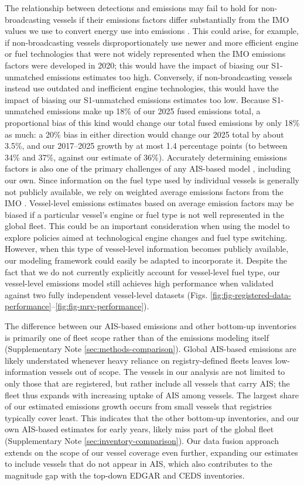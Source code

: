 \documentclass[lineno,pdflatex,sn-nature]{sn-jnl}
\begin{document}
The relationship between detections and emissions may fail to hold for non-broadcasting vessels if their emissions factors differ substantially from the IMO values we use to convert energy use into emissions \cite{fourth2020greenhouse}. This could arise, for example, if non-broadcasting vessels disproportionately use newer and more efficient engine or fuel technologies that were not widely represented when the IMO emissions factors were developed in 2020; this would have the impact of biasing our S1-unmatched emissions estimates too high. Conversely, if non-broadcasting vessels instead use outdated and inefficient engine technologies, this would have the impact of biasing our S1-unmatched emissions estimates too low. Because S1-unmatched emissions make up 18\% of our 2025 fused emissions total, a proportional bias of this kind would change our total fused emissions by only 18\% as much: a 20\% bias in either direction would change our 2025 total by about 3.5\%, and our 2017--2025 growth by at most 1.4 percentage points (to between 34\% and 37\%, against our estimate of 36\%). Accurately determining emissions factors is also one of the primary challenges of any AIS-based model \cite{chen2024analysis}, including our own. Since information on the fuel type used by individual vessels is generally not publicly available, we rely on weighted average emissions factors from the IMO \cite{fourth2020greenhouse}. Vessel-level emissions estimates based on average emission factors may be biased if a particular vessel's engine or fuel type is not well represented in the global fleet. This could be an important consideration when using the model to explore policies aimed at technological engine changes and fuel type switching. However, when this type of vessel-level information becomes publicly available, our modeling framework could easily be adapted to incorporate it. Despite the fact that we do not currently explicitly account for vessel-level fuel type, our vessel-level emissions model still achieves high performance when validated against two fully independent vessel-level datasets (Figs. \ref{fig:fig-registered-data-performance}--\ref{fig:fig-mrv-performance}). 

The difference between our AIS-based emissions and other bottom-up inventories is primarily one of fleet scope rather than of the emissions modeling itself (Supplementary Note \ref{sec:methods-comparison}). Global AIS-based emissions are likely understated whenever heavy reliance on registry-defined fleets leaves low-information vessels out of scope. The vessels in our analysis are not limited to only those that are registered, but rather include all vessels that carry AIS; the fleet thus expands with increasing uptake of AIS among vessels. The largest share of our estimated emissions growth occurs from small vessels that registries typically cover least. This indicates that the other bottom-up inventories, and our own AIS-based estimates for early years, likely miss part of the global fleet (Supplementary Note \ref{sec:inventory-comparison}). Our data fusion approach extends on the scope of our vessel coverage even further, expanding our estimates to include vessels that do not appear in AIS, which also contributes to the magnitude gap with the top-down EDGAR and CEDS inventories. 
\end{document}
